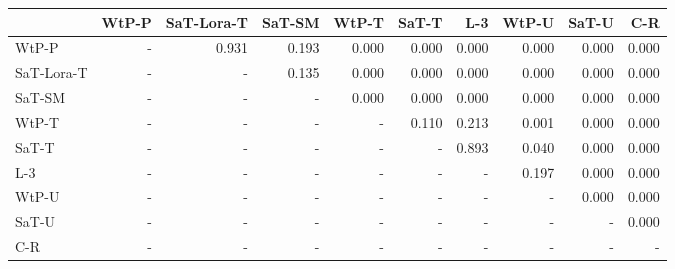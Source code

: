 \begin{tabular}{lrrrrrrrrr}
\toprule
 & WtP-P & SaT-Lora-T & SaT-SM & WtP-T & SaT-T & L-3 & WtP-U & SaT-U & C-R \\
\midrule
WtP-P & - & 0.931 & 0.193 & 0.000 & 0.000 & 0.000 & 0.000 & 0.000 & 0.000 \\
SaT-Lora-T & - & - & 0.135 & 0.000 & 0.000 & 0.000 & 0.000 & 0.000 & 0.000 \\
SaT-SM & - & - & - & 0.000 & 0.000 & 0.000 & 0.000 & 0.000 & 0.000 \\
WtP-T & - & - & - & - & 0.110 & 0.213 & 0.001 & 0.000 & 0.000 \\
SaT-T & - & - & - & - & - & 0.893 & 0.040 & 0.000 & 0.000 \\
L-3 & - & - & - & - & - & - & 0.197 & 0.000 & 0.000 \\
WtP-U & - & - & - & - & - & - & - & 0.000 & 0.000 \\
SaT-U & - & - & - & - & - & - & - & - & 0.000 \\
C-R & - & - & - & - & - & - & - & - & - \\
\bottomrule
\end{tabular}

